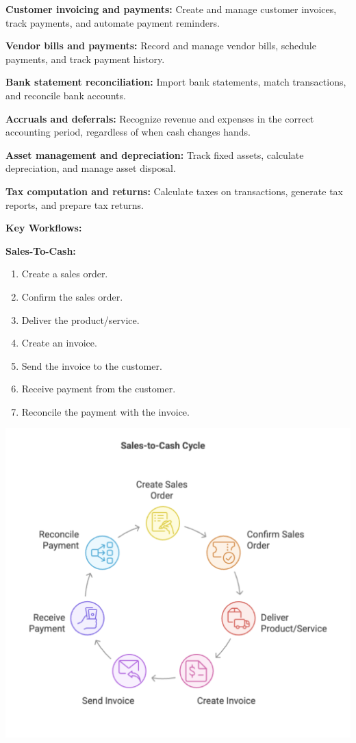\documentclass[11pt,a4paper]{article}
\begin{document}
\noindent\textbf{Customer invoicing and payments:} Create and manage customer invoices, track payments, and automate payment reminders.

\noindent\textbf{Vendor bills and payments:} Record and manage vendor bills, schedule payments, and track payment history.

\noindent\textbf{Bank statement reconciliation:} Import bank statements, match transactions, and reconcile bank accounts.

\noindent\textbf{Accruals and deferrals:} Recognize revenue and expenses in the correct accounting period, regardless of when cash changes hands.

\noindent\textbf{Asset management and depreciation:} Track fixed assets, calculate depreciation, and manage asset disposal.

\noindent\textbf{Tax computation and returns:} Calculate taxes on transactions, generate tax reports, and prepare tax returns.

\newpage
\noindent\textbf{Key Workflows:}

\medskip
\noindent\textbf{Sales-To-Cash:}

\noindent
\begin{minipage}{0.5\textwidth}
\begin{enumerate}
    \item Create a sales order.
    \item Confirm the sales order.
    \item Deliver the product/service.
    \item Create an invoice.
    \item Send the invoice to the customer.
    \item Receive payment from the customer.
    \item Reconcile the payment with the invoice.
\end{enumerate}
\end{minipage}%
\hfill
\begin{minipage}{0.45\textwidth}
    \centering
    \includegraphics[width=\linewidth]{diagram/sales_to_cash_cycle.png}
\end{minipage}
\end{document}
